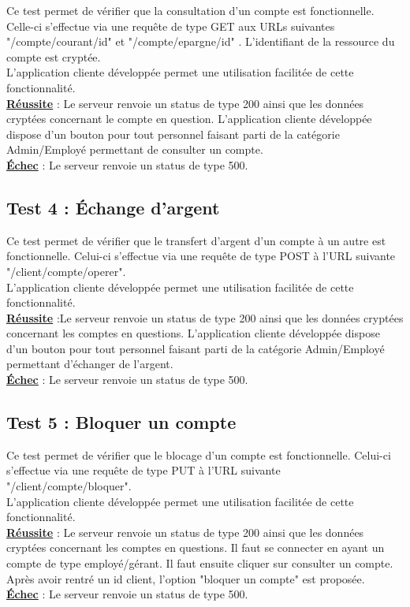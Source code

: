 Ce test permet de vérifier que la consultation d'un compte est fonctionnelle.
Celle-ci s'effectue via une requête de type GET aux URLs suivantes "/compte/courant/{id}" et "/compte/epargne/{id}" .
L'identifiant de la ressource du compte est cryptée.
\\
L'application cliente développée permet une utilisation facilitée de cette fonctionnalité. 
\\
\textbf{\underline{Réussite}} : Le serveur renvoie un status de type 200 ainsi que les données cryptées concernant le compte en question.
L'application cliente développée dispose d'un bouton pour tout personnel faisant parti de la catégorie Admin/Employé permettant de consulter un compte.
\\
\textbf{\underline{Échec}} : Le serveur renvoie un status de type 500.

\subsection{Test 4 : Échange d'argent}

Ce test permet de vérifier que le transfert d'argent d'un compte à un autre est fonctionnelle.
Celui-ci s'effectue via une requête de type POST à l’URL suivante "/client/compte/operer".
\\
L'application cliente développée permet une utilisation facilitée de cette fonctionnalité. 
\\
\textbf{\underline{Réussite}} :Le serveur renvoie un status de type 200 ainsi que les données cryptées concernant les comptes en questions.
L'application cliente développée dispose d'un bouton pour tout personnel faisant parti de la catégorie Admin/Employé permettant d'échanger de l'argent.
\\
\textbf{\underline{Échec}} : Le serveur renvoie un status de type 500.

\subsection{Test 5 : Bloquer un compte}

Ce test permet de vérifier que le blocage d'un compte est fonctionnelle.
Celui-ci s'effectue via une requête de type PUT à l’URL suivante "/client/compte/bloquer".
\\
L'application cliente développée permet une utilisation facilitée de cette fonctionnalité. 
\\
\textbf{\underline{Réussite}} : Le serveur renvoie un status de type 200 ainsi que les données cryptées concernant les comptes en questions.
Il faut se connecter en ayant un compte de type employé/gérant. Il faut ensuite cliquer sur consulter un compte. Après avoir rentré un id client, l'option "bloquer un compte" est proposée.
\\
\textbf{\underline{Échec}} :  Le serveur renvoie un status de type 500.

